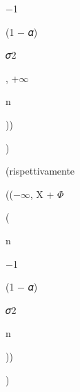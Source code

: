 \documentclass[a4paper,portrait,12pt]{article}
\begin{document}
$-$1





\begin{flushleft}
(1 $-$ 𝛼)
\end{flushleft}





\begin{flushleft}
𝜎2
\end{flushleft}


, +$\infty$


\begin{flushleft}
n
\end{flushleft}





))


)





\begin{flushleft}
(rispettivamente
\end{flushleft}





\begin{flushleft}
(($-$$\infty$, X + $\Phi$
\end{flushleft}


(


\begin{flushleft}
n
\end{flushleft}





$-$1





\begin{flushleft}
(1 $-$ 𝛼)
\end{flushleft}





\begin{flushleft}
𝜎2
\end{flushleft}


\begin{flushleft}
n
\end{flushleft}





))


)
\end{document}
